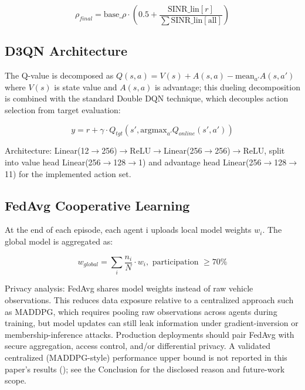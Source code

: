 \documentclass[journal,10pt,twocolumn]{IEEEtran}
\begin{document}
\begin{equation}
\label{eq:rho_final}
\rho_{final} = \text{base\_}\rho \cdot \left(0.5 + \frac{\text{SINR\_lin}[r]}{\sum \text{SINR\_lin}[\text{all}]}\right)
\end{equation}

\subsection{D3QN Architecture}

The Q-value is decomposed as $Q(s,a) = V(s) + A(s,a) - \text{mean}_{a'} A(s,a')$ where $V(s)$ is state value and $A(s,a)$ is advantage; this dueling decomposition is combined with the standard Double DQN technique, which decouples action selection from target evaluation:

\begin{equation}
\label{eq:ddqn}
y = r + \gamma \cdot Q_{tgt}(s', \text{argmax}_{a'} Q_{online}(s', a'))
\end{equation}

\begingroup\raggedright
Architecture: Linear(12$\rightarrow$256)$\rightarrow$\allowbreak ReLU$\rightarrow$\allowbreak Linear(256$\rightarrow$256)$\rightarrow$ReLU, split into value head Linear(256$\rightarrow$128$\rightarrow$1) and advantage head Linear(256$\rightarrow$128$\rightarrow$11) for the implemented action set.
\par\endgroup

\subsection{FedAvg Cooperative Learning}

At the end of each episode, each agent i uploads local model weights $w_i$. The global model is aggregated as:

\begin{equation}
\label{eq:fedavg}
w_{global} = \sum_i \frac{n_i}{N} \cdot w_i, \text{ participation } \geq 70\%
\end{equation}

Privacy analysis: FedAvg shares model weights instead of raw vehicle observations. This reduces data exposure relative to a centralized approach such as MADDPG, which requires pooling raw observations across agents during training, but model updates can still leak information under gradient-inversion or membership-inference attacks. Production deployments should pair FedAvg with secure aggregation, access control, and/or differential privacy. A validated centralized (MADDPG-style) performance upper bound is not reported in this paper's results (); see the Conclusion for the disclosed reason and future-work scope.
\end{document}
